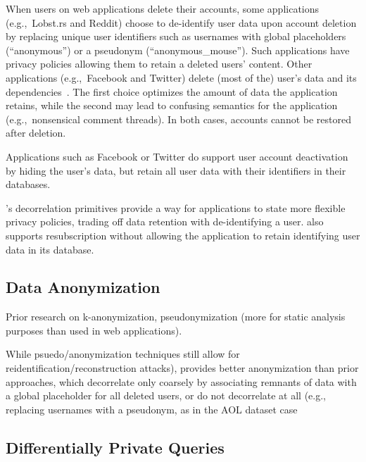 When users on web applications delete their accounts, some applications (e.g.,\ Lobst.rs and Reddit)
choose to de-identify user data upon account deletion by replacing unique user identifiers such as
usernames with global placeholders (``anonymous'') or a pseudonym (``anonymous\_mouse''). Such
applications have privacy policies allowing them to retain a deleted users' content.
Other applications (e.g.,\ Facebook and Twitter) delete (most of the) user's data and its
dependencies~\cite{delf}. 
The first choice optimizes the amount of data the application retains, while the second may lead to
confusing semantics for the application (e.g.,\ nonsensical comment threads). In both cases,
accounts cannot be restored after deletion. 

Applications such as Facebook or Twitter do support user account deactivation by hiding the user's
data, but retain all user data with their identifiers in their databases.  

\sys{}'s decorrelation primitives provide a way for applications to state more flexible privacy
policies, trading off data retention with de-identifying a user.
\sys{} also supports resubscription without allowing the application to retain identifying user data
in its database.

\subsection{Data Anonymization}

Prior research on k-anonymization, pseudonymization (more for static analysis purposes than used in
web applications).

While psuedo/anonymization
techniques still allow for reidentification/reconstruction attacks), \sys{} provides better
anonymization than prior approaches, which decorrelate only coarsely by associating remnants of data
with a global placeholder for all deleted users, or do not decorrelate at all (e.g., replacing
usernames with a pseudonym, as in the AOL dataset case~%

\subsection{Differentially Private Queries}

